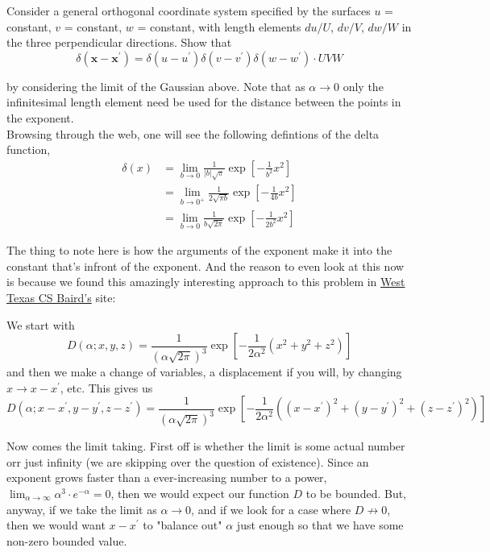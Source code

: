Consider a general orthogonal coordinate system specified by the surfaces $u$ = constant, $v$ = constant,
$w$ = constant, with length elements $du/U$, $dv/V$, $dw/W$ in the three perpendicular directions.
Show that
$$
\delta\left( \mathbf{x} - \mathbf{x}^\prime \right) =
    \delta\left(u - u^\prime\right) \delta\left(v - v^\prime\right) \delta\left(w - w^\prime\right) \cdot UVW
$$

by considering the limit of the Gaussian above.
Note that as $\alpha \rightarrow 0$ only the infinitesimal length
element need be used for the distance between the points in the exponent.
\\

Browsing through the web, one will see the following defintions of the delta function,
\begin{align*}
\delta (x) &= \lim_{b\rightarrow 0} \frac{1}{|b|\sqrt{\pi}} \exp{ \left[ -\frac{1}{b^2} x^2 \right]} \\
    &= \lim_{b\rightarrow 0^+} \frac{1}{2\sqrt{\pi b}} \exp{ \left[ -\frac{1}{4b} x^2 \right]} \\
    &= \lim_{b\rightarrow 0} \frac{1}{b \sqrt{2\pi}} \exp{ \left[ -\frac{1}{2b^2} x^2 \right]}
\end{align*}

The thing to note here is how the arguments of the exponent make it into the constant that's infront of the exponent.
And the reason to even look at this now is because we found this amazingly interesting approach to this problem in
\href{https://www.wtamu.edu/~cbaird/courses.html}{West Texas CS Baird's} site:

We start with
$$
D\left(\alpha ; x, y, z \right) =
    \frac{1}{\left(\alpha \sqrt{2\pi}\right)^3}
    \exp{ \left[ -\frac{1}{2\alpha^2} \left( x^2 + y^2 + z^2 \right) \right] }
$$
and then we make a change of variables, a displacement if you will, by changing $x \rightarrow x - x^\prime$, etc.
This gives us
$$
D\left(\alpha ; x-x^\prime, y-y^\prime, z-z^\prime \right) =
    \frac{1}{\left(\alpha \sqrt{2\pi}\right)^3}
    \exp{ \left[ -\frac{1}{2\alpha^2} \left( (x-x^\prime)^2 + (y-y^\prime)^2 + (z-z^\prime)^2 \right) \right] }
$$

Now comes the limit taking.
First off is whether the limit is some actual number orr just infinity (we are skipping over the question of existence).
Since an exponent grows faster than a ever-increasing number to a power,
$\lim_{\alpha\rightarrow \infty} \alpha^3 \cdot e^{-\alpha} = 0$,
then we would expect our function $D$ to be bounded.
But, anyway, if we take the limit as $\alpha\rightarrow 0$, and if we look for a case where $D\not\rightarrow 0$,
then we would want $x-x^\prime$ to "balance out" $\alpha$ just enough so that we have some non-zero bounded value.

